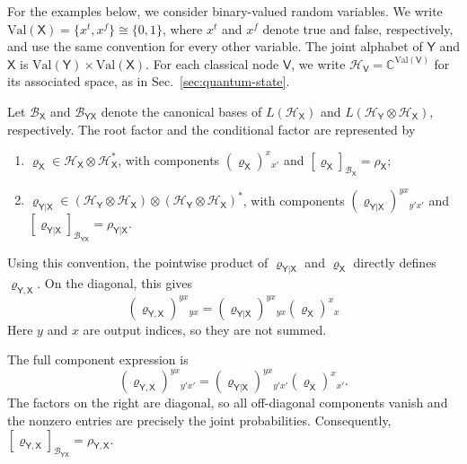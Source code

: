 \documentclass[
    aps,
    pra,
    reprint,
    superscriptaddress,
    nofootinbib
]{revtex4-2}
\theoremstyle{definition}
\theoremstyle{plain}
\begin{document}
For the examples below, we consider binary-valued random variables. We
write
$\mathrm{Val}(\mathsf{X})=\{x^{t},x^{f}\}\cong\{0,1\}$,
where $x^{t}$ and $x^{f}$ denote true and false, respectively, and use
the same convention for every other variable. The joint alphabet of
$\mathsf{Y}$ and $\mathsf{X}$ is
$\mathrm{Val}(\mathsf{Y})\times\mathrm{Val}(\mathsf{X})$.
For each classical node $\mathsf{V}$, we write
$\mathcal{H}_{\mathsf{V}}=\mathbb{C}^{\mathrm{Val}(\mathsf{V})}$ for its
associated space, as in Sec.~\ref{sec:quantum-state}.

Let $\mathcal{B}_{\mathsf{X}}$ and
$\mathcal{B}_{\mathsf{Y}\mathsf{X}}$ denote the canonical bases of
$L(\mathcal{H}_{\mathsf{X}})$ and
$L(\mathcal{H}_{\mathsf{Y}}\otimes\mathcal{H}_{\mathsf{X}})$,
respectively. The root factor and the conditional factor are represented
by
\begin{enumerate}
    \item
    $\varrho_{\mathsf{X}}
    \in
    \mathcal{H}_{\mathsf{X}}\otimes\mathcal{H}_{\mathsf{X}}^{*}$,
    with components
    $(\varrho_{\mathsf{X}})^{x}{}_{x'}$ and
    $[\varrho_{\mathsf{X}}]_{\mathcal{B}_{\mathsf{X}}}
    =\rho_{\mathsf{X}}$;

    \item
    $\varrho_{\mathsf{Y}|\mathsf{X}}
    \in
    (\mathcal{H}_{\mathsf{Y}}\otimes\mathcal{H}_{\mathsf{X}})
    \otimes
    (\mathcal{H}_{\mathsf{Y}}\otimes\mathcal{H}_{\mathsf{X}})^{*}$,
    with components
    $(\varrho_{\mathsf{Y}|\mathsf{X}})
    ^{yx}{}_{y'x'}$ and
    $[\varrho_{\mathsf{Y}|\mathsf{X}}]
    _{\mathcal{B}_{\mathsf{Y}\mathsf{X}}}
    =\rho_{\mathsf{Y}|\mathsf{X}}$.
\end{enumerate}

Using this convention, the pointwise product of
$\varrho_{\mathsf{Y}|\mathsf{X}}$ and $\varrho_{\mathsf{X}}$ directly
defines $\varrho_{\mathsf{Y},\mathsf{X}}$. On the diagonal, this gives
\begin{equation}
    (\varrho_{\mathsf{Y},\mathsf{X}})
    ^{yx}{}_{yx}
    =
    (\varrho_{\mathsf{Y}|\mathsf{X}})
    ^{yx}{}_{yx}
    (\varrho_{\mathsf{X}})^{x}{}_{x}
    \label{eq:pointwise-factor}
\end{equation}
Here $y$ and $x$ are output indices, so they are not summed.

The full component expression is
\begin{equation}
    (\varrho_{\mathsf{Y},\mathsf{X}})
    ^{yx}{}_{y'x'}
    =
    (\varrho_{\mathsf{Y}|\mathsf{X}})
    ^{yx}{}_{y'x'}
    (\varrho_{\mathsf{X}})^{x}{}_{x'}.
\end{equation}
The factors on the right are diagonal, so all off-diagonal components
vanish and the nonzero entries are precisely the joint probabilities.
Consequently,
$[\varrho_{\mathsf{Y},\mathsf{X}}]
_{\mathcal{B}_{\mathsf{Y}\mathsf{X}}}
=\rho_{\mathsf{Y},\mathsf{X}}$.
\end{document}
